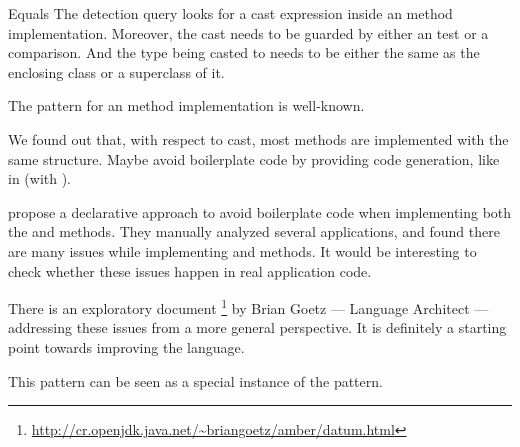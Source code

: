 \begin{pattern}{Equals}
\detection{}
The detection query looks for a cast expression inside an  method implementation.
Moreover, the cast needs to be guarded by either an  test or a  comparison.
And the type being casted to needs to be either the same as the enclosing class or a superclass of it.

\discussion{}
The pattern for an  method implementation is well-known.

We found out that, with respect to cast,
most  methods are implemented with the same structure.
Maybe avoid boilerplate code by providing code generation,
%
%
like in \haskell{} (with ).

\cite{vaziriDeclarativeObjectIdentity2007} propose a declarative approach to avoid boilerplate code when implementing both the  and  methods.
They manually analyzed several applications, and found there are many issues while implementing  and  methods.
It would be interesting to check whether these issues happen in real application code.

There is an exploratory document%
\footnote{\url{http://cr.openjdk.java.net/\~briangoetz/amber/datum.html}}
by Brian Goetz --- \java{} Language Architect --- addressing these issues from a more general perspective.
It is definitely a starting point towards improving the \java{} language.

\related{}
This pattern can be seen as a special instance of the  pattern.
\end{pattern}